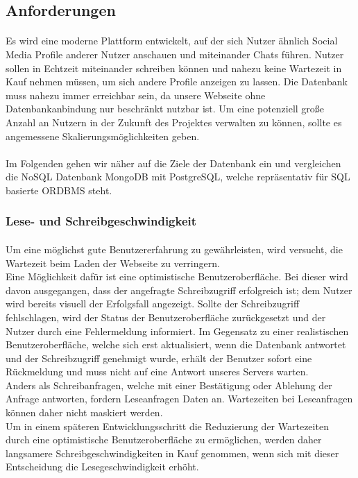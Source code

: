 \subsection{Anforderungen}
\paragraph{}
Es wird eine moderne Plattform entwickelt, auf der sich Nutzer ähnlich Social Media Profile anderer Nutzer anschauen und miteinander Chats führen. Nutzer sollen in Echtzeit miteinander schreiben können und nahezu keine Wartezeit in Kauf nehmen müssen, um sich andere Profile anzeigen zu lassen. Die Datenbank muss nahezu immer erreichbar sein, da unsere Webseite ohne Datenbankanbindung nur beschränkt nutzbar ist. Um eine potenziell große Anzahl an Nutzern in der Zukunft des Projektes verwalten zu können, sollte es angemessene Skalierungsmöglichkeiten geben.

\paragraph{}
Im Folgenden gehen wir näher auf die Ziele der Datenbank ein und vergleichen die NoSQL Datenbank MongoDB mit PostgreSQL, welche repräsentativ für SQL basierte ORDBMS steht. 

\subsubsection{Lese- und Schreibgeschwindigkeit}
\paragraph{}
Um eine möglichst gute Benutzererfahrung zu gewährleisten, wird versucht, die Wartezeit beim Laden der Webseite zu verringern.\\
Eine Möglichkeit dafür ist eine optimistische Benutzeroberfläche. Bei dieser wird davon ausgegangen, dass der angefragte Schreibzugriff erfolgreich ist; dem Nutzer wird bereits visuell der Erfolgsfall angezeigt. Sollte der Schreibzugriff fehlschlagen, wird der Status der Benutzeroberfläche zurückgesetzt und der Nutzer durch eine Fehlermeldung informiert. Im Gegensatz zu einer realistischen Benutzeroberfläche, welche sich erst aktualisiert, wenn die Datenbank antwortet und der Schreibzugriff genehmigt wurde, erhält der Benutzer sofort eine Rückmeldung und muss nicht auf eine Antwort unseres Servers warten.\\
Anders als Schreibanfragen, welche mit einer Bestätigung oder Ablehung der Anfrage antworten, fordern Leseanfragen Daten an. Wartezeiten bei Leseanfragen können daher nicht maskiert werden.\\
Um in einem späteren Entwicklungsschritt die Reduzierung der Wartezeiten durch eine optimistische Benutzeroberfläche zu ermöglichen, werden daher langsamere Schreibgeschwindigkeiten in Kauf genommen, wenn sich mit dieser Entscheidung die Lesegeschwindigkeit erhöht.

